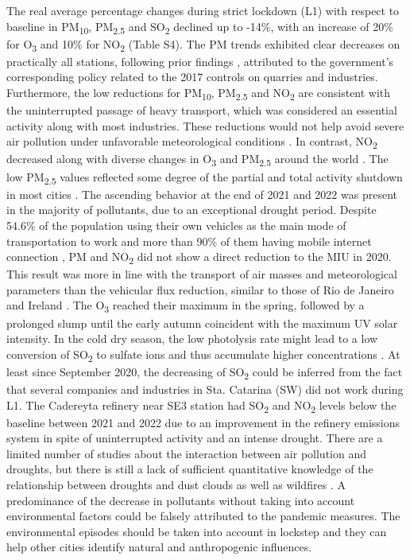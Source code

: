 \documentclass[sn-mathphys-num]{sn-jnl}
\begin{document}
The real average percentage changes during strict lockdown (L1) with respect to baseline in PM\textsubscript{10}, PM\textsubscript{2.5} and SO\textsubscript{2} declined up to -14\%, with an increase of 20\% for O\textsubscript{3} and 10\% for NO\textsubscript{2} (Table S4). The PM trends exhibited clear decreases on practically all stations, following prior findings \citep{Aguirre_L_pez_2022}, attributed to the government's corresponding policy related to the 2017 controls on quarries and industries. Furthermore, the low reductions for PM\textsubscript{10}, PM\textsubscript{2.5} and NO\textsubscript{2} are consistent with the uninterrupted passage of heavy transport, which was considered an essential activity along with most industries. These reductions would not help avoid severe air pollution under unfavorable meteorological conditions \citep{Wang_2020}. In contrast, NO\textsubscript{2} decreased along with diverse changes in O\textsubscript{3} and PM\textsubscript{2.5} around the world \citep{Sokhi2021}. The low PM\textsubscript{2.5} values reflected some degree of the partial and total activity shutdown in most cities \citep{Chauhan_2020,Saha_2022}. The ascending behavior at the end of 2021 and 2022 was present in the majority of pollutants, due to an exceptional drought period. Despite 54.6\% of the population using their own vehicles as the main mode of transportation to work \citep{mxico} and more than 90\% of them having mobile internet connection \citep{inegi2021b}, PM and NO\textsubscript{2} did not show a direct reduction to the MIU in 2020. This result was more in line with the transport of air masses and meteorological parameters than the vehicular flux reduction, similar to those of Rio de Janeiro \citep{Dantas_2020} and Ireland \citep{Spohn_2021}. The O\textsubscript{3} reached their maximum in the spring, followed by a prolonged slump until the early autumn coincident with the maximum UV solar intensity. In the cold dry season, the low photolysis rate might lead to a low conversion of SO\textsubscript{2} to sulfate ions and thus accumulate higher concentrations \citep{Gonz_lez_2018}. At least since September 2020, the decreasing of SO\textsubscript{2} could be inferred from the fact that several companies and industries in Sta. Catarina (SW) did not work during L1. The Cadereyta refinery near SE3 station had SO\textsubscript{2} and NO\textsubscript{2} levels below the baseline between 2021 and 2022 due to an improvement in the refinery emissions system in spite of uninterrupted activity and an intense drought. There are a limited number of studies about the interaction between air pollution and droughts, but there is still a lack of sufficient quantitative knowledge of the relationship between droughts and dust clouds as well as wildfires \citep{He_2024}. A predominance of the decrease in pollutants without taking into account environmental factors could be falsely attributed to the pandemic measures. The environmental episodes should be taken into account in lockstep \citep{Liu2020} and they can help other cities identify natural and anthropogenic influences.
\end{document}
